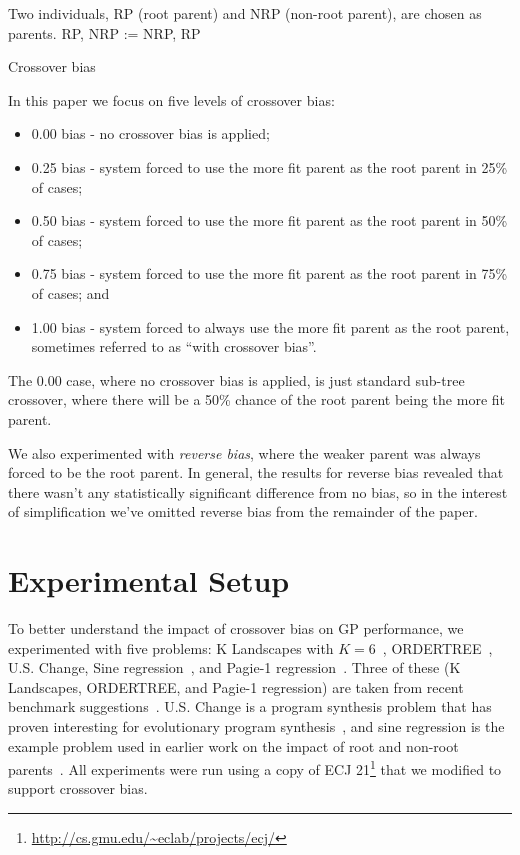 \documentclass{sig-alternate}
\begin{document}
\begin{algorithm}[tb]
\begin{algorithmic}
\Require Two individuals, RP (root parent) and NRP (non-root parent), are chosen as parents.
 
        \State RP, NRP := NRP, RP  
    \EndIf
\EndIf
\end{algorithmic}
\caption{Crossover bias}
\label{alg:biasAlgorithm}
\end{algorithm}

In this paper we focus on five levels of crossover bias:
\begin{itemize}
\item 0.00 bias - no crossover bias is applied;
\item 0.25 bias - system forced to use the more fit parent as the root parent in 25\% of cases;
\item 0.50 bias - system forced to use the more fit parent as the root parent in 50\% of cases;
\item 0.75 bias - system forced to use the more fit parent as the root parent in 75\% of cases; and
\item 1.00 bias - system forced to always use the more fit parent as the root parent, sometimes referred to as ``with
crossover bias''.
\end{itemize}
The 0.00 case, where no crossover bias is applied, is just standard sub-tree crossover, where there will be a 50\%
chance of the root parent being the more fit parent.

We also experimented with \emph{reverse bias}, where the weaker parent was always forced to be the root parent. In
general, the results for reverse bias revealed that there wasn't any statistically significant difference from no bias,
so in the interest of simplification we've omitted reverse bias from the remainder of the paper.

\section{Experimental Setup} \label{sec:Experiments}

To better understand the impact of crossover bias on GP performance, we experimented with five problems: K Landscapes
with $K=6$~\cite{vanneschi2011k}, ORDER\-TREE~\cite{hoang2006ordertree}, U.S. Change, Sine
regression~\cite{poli08:fieldguide}, and Pagie-1 regression~\cite{pagie1997evolutionary}. Three of these (K Landscapes,
ORDERTREE, and Pagie-1 regression) are taken from recent benchmark suggestions~\cite{gp-benchmarks-2013}. U.S. Change
is a program synthesis problem  that has proven interesting for evolutionary program
synthesis~\cite{zhan2014quantitative}, and sine regression is the example problem used in earlier work on the impact of
root and non-root parents~\cite{McPheeDonatucciDramdahl:2014}. 
All experiments were run using a copy of ECJ 21\footnote{\url{http://cs.gmu.edu/~eclab/projects/ecj/}} that we modified
to support crossover bias.
\end{document}
